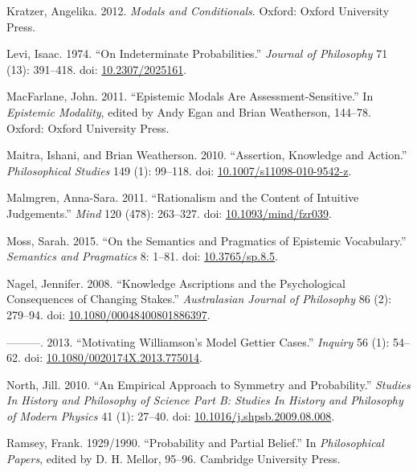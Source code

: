 \documentclass[
  10pt,
  letterpaper,
  DIV=11,
  numbers=noendperiod,
  twoside]{scrartcl}
\newlength{\cslhangindent}
\newenvironment{CSLReferences}[2] %
 {\begin{list}{}{%
  \setlength{\itemindent}{0pt}
  \setlength{\leftmargin}{0pt}
  \setlength{\parsep}{0pt}
  \ifodd #1
   \setlength{\leftmargin}{\cslhangindent}
   \setlength{\itemindent}{-1\cslhangindent}
  \fi
  \setlength{\itemsep}{#2\baselineskip}}}
 {\end{list}}
\begin{document}
\begin{CSLReferences}{1}{0}
Kratzer, Angelika. 2012. \emph{Modals and Conditionals}. Oxford: Oxford
University Press.

Levi, Isaac. 1974. {``On Indeterminate Probabilities.''} \emph{Journal
of Philosophy} 71 (13): 391--418. doi:
\href{https://doi.org/10.2307/2025161}{10.2307/2025161}.

MacFarlane, John. 2011. {``Epistemic Modals Are Assessment-Sensitive.''}
In \emph{Epistemic Modality}, edited by Andy Egan and Brian Weatherson,
144--78. Oxford: Oxford University Press.

Maitra, Ishani, and Brian Weatherson. 2010. {``Assertion, Knowledge and
Action.''} \emph{Philosophical Studies} 149 (1): 99--118. doi:
\href{https://doi.org/10.1007/s11098-010-9542-z}{10.1007/s11098-010-9542-z}.

Malmgren, Anna-Sara. 2011. {``Rationalism and the Content of Intuitive
Judgements.''} \emph{Mind} 120 (478): 263--327. doi:
\href{https://doi.org/10.1093/mind/fzr039}{10.1093/mind/fzr039}.

Moss, Sarah. 2015. {``On the Semantics and Pragmatics of Epistemic
Vocabulary.''} \emph{Semantics and Pragmatics} 8: 1--81. doi:
\href{https://doi.org/10.3765/sp.8.5}{10.3765/sp.8.5}.

Nagel, Jennifer. 2008. {``Knowledge Ascriptions and the Psychological
Consequences of Changing Stakes.''} \emph{Australasian Journal of
Philosophy} 86 (2): 279--94. doi:
\href{https://doi.org/10.1080/00048400801886397}{10.1080/00048400801886397}.

---------. 2013. {``Motivating Williamson's Model Gettier Cases.''}
\emph{Inquiry} 56 (1): 54--62. doi:
\href{https://doi.org/10.1080/0020174X.2013.775014}{10.1080/0020174X.2013.775014}.

North, Jill. 2010. {``An Empirical Approach to Symmetry and
Probability.''} \emph{Studies In History and Philosophy of Science Part
B: Studies In History and Philosophy of Modern Physics} 41 (1): 27--40.
doi:
\href{https://doi.org/10.1016/j.shpsb.2009.08.008}{10.1016/j.shpsb.2009.08.008}.

Ramsey, Frank. 1929/1990. {``Probability and Partial Belief.''} In
\emph{Philosophical Papers}, edited by D. H. Mellor, 95--96. Cambridge
University Press.


\end{CSLReferences}
\end{document}
